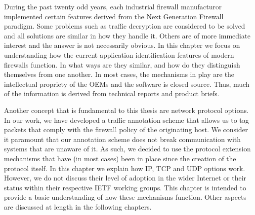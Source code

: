 During the past twenty odd years, each industrial firewall manufacturor
implemented certain features derived from the Next Generation Firewall paradigm.
Some problems such as traffic decryption are considered to be solved and all
solutions are similar in how they handle it. Others are of more immediate interest
and the answer is not necessarily obvious. In this chapter we focus on
understanding how the current application identification features of modern
firewalls function. In what ways are they similar, and how do they distinguish
themselves from one another. In most cases, the mechanisms in play are the
intellectual propriety of the OEMs and the software is closed source. Thus, much
of the information is derived from technical reports and product briefs.

Another concept that is fundamental to this thesis are network protocol options.
In our work, we have developed a traffic annotation scheme that allows us to
tag packets that comply with the firewall policy of the originating host. We
consider it paramount that our annotation scheme does not break communication
with systems that are unaware of it. As such, we decided to use the protocol
extension mechanisms that have (in most cases) been in place since the creation
of the protocol itself. In this chapter we explain how IP, TCP and UDP options
work. However, we do not discuss their level of adoption in the wider Internet
or their status within their respective IETF working groups. This chapter is
intended to provide a basic understanding of how these mechanisms function.
Other aspects are discussed at length in the following chapters.

